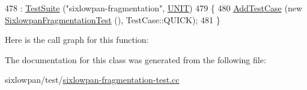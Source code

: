 \begin{DoxyCode}
478   : \hyperlink{classns3_1_1TestSuite_a904b0c40583b744d30908aeb94636d1a}{TestSuite} (\textcolor{stringliteral}{"sixlowpan-fragmentation"}, \hyperlink{classns3_1_1TestSuite_a1ebfcab34ec8161e085e8e3a1855eae0a3885375a3787abf60431f8454b3cadbd}{UNIT})
479 \{
480   \hyperlink{classns3_1_1TestCase_a3718088e3eefd5d6454569d2e0ddd835}{AddTestCase} (\textcolor{keyword}{new} \hyperlink{classSixlowpanFragmentationTest}{SixlowpanFragmentationTest} (), TestCase::QUICK);
481 \}
\end{DoxyCode}


Here is the call graph for this function\+:




The documentation for this class was generated from the following file\+:\begin{DoxyCompactItemize}
\item 
sixlowpan/test/\hyperlink{sixlowpan-fragmentation-test_8cc}{sixlowpan-\/fragmentation-\/test.\+cc}\end{DoxyCompactItemize}
